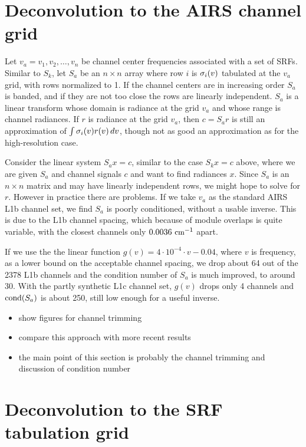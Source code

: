 \documentclass[11pt]{article}
\begin{document}
\section{Deconvolution to the AIRS channel grid}

Let $v_a = v_1,v_2,\ldots,v_n$ be channel center frequencies
associated with a set of SRFs.  Similar to $S_k$, let $S_a$ be an
$n\times n$ array where row $i$ is $\sigma_i(v)$ tabulated at the $v_a$
grid, with rows normalized to 1.  If the channel centers are in
increasing order $S_a$ is banded, and if they are not too close the
rows are linearly independent.  $S_a$ is a linear transform whose
domain is radiance at the grid $v_a$ and whose range is channel
radiances.  If $r$ is radiance at the grid $v_a$, then $c = S_a r$ is
still an approximation of $\int\sigma_i(v)r(v)\,dv$, though not as good
an approximation as for the high-resolution case.

Consider the linear system $S_a x = c$, similar to the case $S_k x =
c$ above, where we are given $S_a$ and channel signals $c$ and want
to find radiances $x$.  Since $S_a$ is an $n \times n$ matrix and
may have linearly independent rows, we might hope to solve for $r$.
However in practice there are problems.  If we take $v_a$ as the
standard AIRS L1b channel set, we find $S_a$ is poorly conditioned,
without a usable inverse.  This is due to the L1b channel spacing,
which because of module overlaps is quite variable, with the closest
channels only $0.0036\ \wnum$ apart.

If we use the the linear function $g(v) = 4\cdot 10^{-4} \cdot v -
0.04$, where $v$ is frequency, as a lower bound on the acceptable
channel spacing, we drop about 64 out of the 2378 L1b channels and
the condition number of $S_a$ is much improved, to around 30.  With
the partly synthetic L1c channel set, $g(v)$ drops only 4 channels
and $\hbox{cond}(S_a)$ is about 250, still low enough for a useful
inverse.

\begin{itemize}
  \item show figures for channel trimming
  \item compare this approach with more recent results
  \item the main point of this section is probably the channel
    trimming and discussion of condition number
\end{itemize}


\section{Deconvolution to the SRF tabulation grid}
\end{document}
